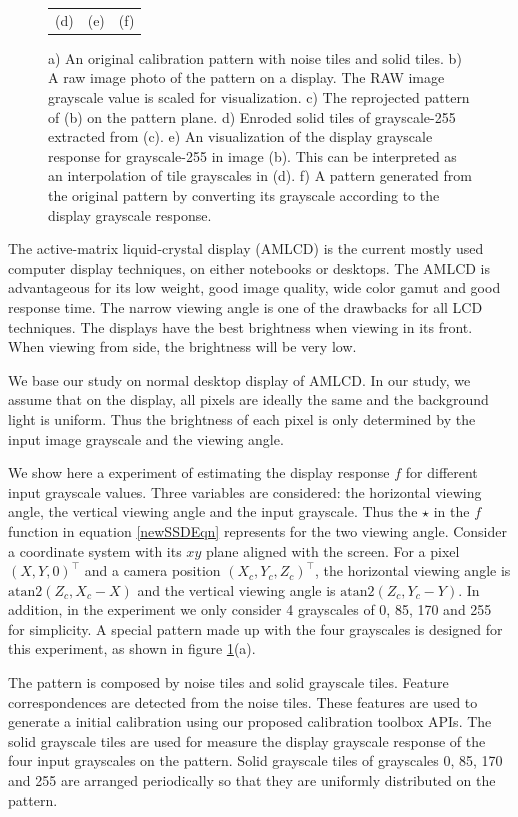 \documentclass{report}
\begin{document}
\begin{figure}
\begin{tabular}{ccc}
(d)&(e)&(f)
\end{tabular}
\caption{a) An original calibration pattern with noise tiles and solid tiles. b) A raw image photo of the pattern on a display. The RAW image grayscale value is scaled for visualization. c) The reprojected pattern of (b) on the pattern plane. d) Enroded solid tiles of grayscale-255 extracted from (c). e) An visualization of the display grayscale response for grayscale-255 in image (b). This can be interpreted as an interpolation of tile grayscales in (d). f) A pattern generated from the original pattern by converting its grayscale according to the display grayscale response. }
\label{displayPattern}
\end{figure}

The active-matrix liquid-crystal display (AMLCD) is the current mostly used computer display techniques, on either notebooks or desktops. The AMLCD is advantageous for its low weight, good image quality, wide color gamut and good response time. The narrow viewing angle is one of the drawbacks for all LCD techniques. The displays have the best brightness when viewing in its front. When viewing from side, the brightness will be very low. 

We base our study on normal desktop display of AMLCD. In our study, we assume that on the display, all pixels are ideally the same and the background light is uniform. Thus the brightness of each pixel is only determined by the input image grayscale and the viewing angle. 

We show here a experiment of estimating the display response $f$ for different input grayscale values. Three variables are considered: the horizontal viewing angle, the vertical viewing angle and the input grayscale. Thus the $\star$ in the $f$ function in equation \ref{newSSDEqn} represents for the two viewing angle. Consider a coordinate system with its $xy$ plane aligned with the screen. For a pixel $(X, Y, 0)^\top$ and a camera position $(X_c, Y_c, Z_c)^\top$, the horizontal viewing angle is $\text{atan2}(Z_c, X_c - X)$ and the vertical viewing angle is $\text{atan2}(Z_c, Y_c - Y)$. In addition, in the experiment we only consider 4 grayscales of 0, 85, 170 and 255 for simplicity. A special pattern made up with the four grayscales is designed for this experiment, as shown in figure \ref{displayPattern}(a). 

The pattern is composed by noise tiles and solid grayscale tiles. Feature correspondences are detected from the noise tiles. These features are used to generate a initial calibration using our proposed calibration toolbox APIs. The solid grayscale tiles are used for measure the display grayscale response of the four input grayscales on the pattern. Solid grayscale tiles of grayscales 0, 85, 170 and 255 are arranged periodically so that they are uniformly distributed on the pattern. 
\end{document}

